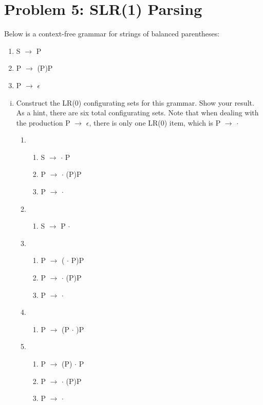 \documentclass{article}
\begin{document}
\section{Problem 5: SLR(1) Parsing}

Below is a context-free grammar for strings of balanced parentheses:
\begin{enumerate}[(1)]
	\item S $\to$ P
	\item P $\to$ (P)P
	\item P $\to$ $\epsilon$
\end{enumerate}

\begin{enumerate}[i.]
	\item Construct the LR(0) configurating sets for this grammar. Show
		your result. As a hint, there are six total configurating sets.
		Note that when dealing with the production P $\to$ $\epsilon$,
		there is only one LR(0) item, which is P $\to$ $\cdot$

		\begin{enumerate}[(1)]
			\item \begin{enumerate}[]
				\item S $\to$ $\cdot$ P
				\item P $\to$ $\cdot$ (P)P
				\item P $\to$ $\cdot$
			\end{enumerate}

			\item \begin{enumerate}[]
				\item S $\to$ P $\cdot$
			\end{enumerate}

			\item \begin{enumerate}[]
				\item P $\to$ ( $\cdot$ P)P
				\item P $\to$ $\cdot$ (P)P
				\item P $\to$ $\cdot$
			\end{enumerate}

			\item \begin{enumerate}[]
				\item P $\to$ (P $\cdot$ )P
			\end{enumerate}

			\item \begin{enumerate}[]
				\item P $\to$ (P) $\cdot$ P
				\item P $\to$ $\cdot$ (P)P
				\item P $\to$ $\cdot$
			\end{enumerate}


\end{enumerate}
\end{enumerate}
\end{document}
